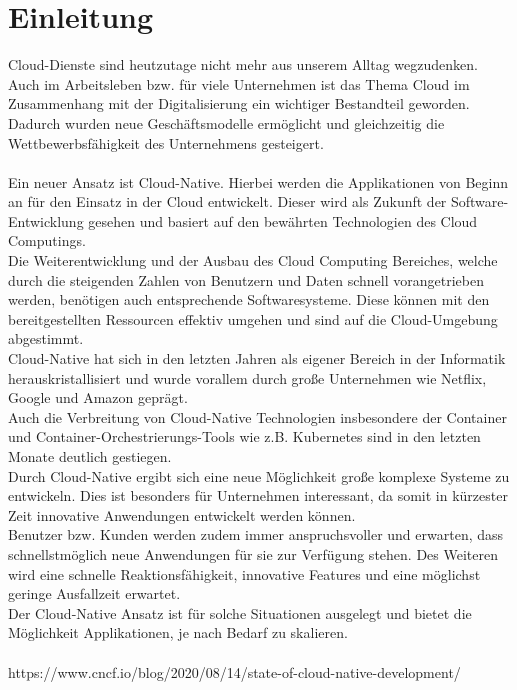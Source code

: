 \chapter{Einleitung}
Cloud-Dienste sind heutzutage nicht mehr aus unserem Alltag wegzudenken. Auch im Arbeitsleben bzw. für viele Unternehmen ist das Thema Cloud im Zusammenhang mit der Digitalisierung ein wichtiger Bestandteil geworden. Dadurch wurden neue Geschäftsmodelle ermöglicht und gleichzeitig die Wettbewerbsfähigkeit des Unternehmens gesteigert.\\
\\
Ein neuer Ansatz ist Cloud-Native. Hierbei werden die Applikationen von Beginn an für den Einsatz in der Cloud entwickelt. Dieser wird als Zukunft der Software-Entwicklung gesehen und basiert auf den bewährten Technologien des Cloud Computings.\\
Die Weiterentwicklung und der Ausbau des Cloud Computing Bereiches, welche durch die steigenden Zahlen von Benutzern und Daten schnell vorangetrieben werden, benötigen auch entsprechende Softwaresysteme. Diese können mit den bereitgestellten Ressourcen effektiv umgehen und sind auf die Cloud-Umgebung abgestimmt.\\
Cloud-Native hat sich in den letzten Jahren als eigener Bereich in der Informatik herauskristallisiert und wurde vorallem durch große Unternehmen wie Netflix, Google und Amazon geprägt.\\
Auch die Verbreitung von Cloud-Native Technologien insbesondere der Container und Container-Orchestrierungs-Tools wie z.B. Kubernetes sind in den letzten Monate deutlich gestiegen.\\
Durch Cloud-Native ergibt sich eine neue Möglichkeit große komplexe Systeme zu entwickeln. Dies ist besonders für Unternehmen interessant, da somit in kürzester Zeit innovative Anwendungen entwickelt werden können.\\
Benutzer bzw. Kunden werden zudem immer anspruchsvoller und erwarten, dass schnellstmöglich neue Anwendungen für sie zur Verfügung stehen. Des Weiteren wird eine schnelle Reaktionsfähigkeit, innovative Features und eine möglichst geringe Ausfallzeit erwartet.\\
Der Cloud-Native Ansatz ist für solche Situationen ausgelegt und bietet die Möglichkeit Applikationen, je nach Bedarf zu skalieren.\\
\\

https://www.cncf.io/blog/2020/08/14/state-of-cloud-native-development/